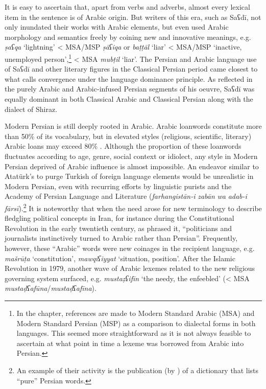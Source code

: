 \documentclass[output=paper]{langsci/langscibook}
\begin{document}
It is easy to ascertain that, apart from verbs and adverbs, almost every lexical item in the sentence is of Arabic origin. But writers of this era, such as Saʕdī, not only inundated their works with Arabic elements, but even used Arabic morphology and semantics freely by coining new and innovative meanings, e.g. \textit{ṣaʕqa} ‘lightning’ < MSA/MSP \textit{ṣāʕiqa} or \textit{baṭṭāl} ‘liar’ < MSA/MSP ‘inactive, unemployed person’,\footnote{In the chapter, references are made to Modern Standard Arabic (MSA) and Modern Standard Persian (MSP) as a comparison to dialectal forms in both languages. This seemed more straightforward as it is not always feasible to ascertain at what point in time a lexeme was borrowed from Arabic into Persian.} < MSA \textit{mubṭil} ‘liar’. The Persian and Arabic language use of Saʕdī and other literary figures in the Classical Persian period came closest to what \citet{Lucas2015} calls convergence under the language dominance principle. As reflected in the purely Arabic and Arabic-infused Persian segments of his oeuvre, Saʕdī was equally dominant in both Classical Arabic and Classical Persian along with the dialect of Shiraz.

Modern Persian is still deeply rooted in Arabic. Arabic loanwords constitute more than 50\% of its vocabulary, but in elevated styles (religious, scientific, literary) Arabic loans may exceed 80\% \citep{Jeremiás2011}. Although the proportion of these loanwords fluctuates according to age, genre, social context or idiolect, any style in Modern Persian deprived of Arabic influence is almost impossible. An endeavor similar to Atatürk’s to purge Turkish of foreign language elements would be unrealistic in Modern Persian, even with recurring efforts by linguistic purists and the Academy of Persian Language and Literature (\textit{farhangistān-i} \textit{zabān} \textit{wa} \textit{adab-i} \textit{fārsī}).\footnote{An example of their activity is the publication (by \citealt{Rāzī2004}) of a dictionary that lists “pure” Persian words.} It is noteworthy that when the need arose for new terminology to describe fledgling political concepts in Iran, for instance during the Constitutional Revolution in the early twentieth\textsuperscript{} century, as \citet{Elwell-Sutton2000} phrased it, “politicians and journalists instinctively turned to Arabic rather than Persian”. Frequently, however, these “Arabic” words were new coinages in the recipient language, e.g. \textit{mašrūṭa} ‘constitution’, \textit{mawqiʕiyyat} ‘situation, position’. After the Islamic Revolution in 1979, another wave of Arabic lexemes related to the new religious governing system surfaced, e.g. \textit{mustaẓʕifīn} ‘the needy, the enfeebled’ (< MSA \textit{mustaḍʕafūna}\kern 0.5pt/\kern -1pt\textit{mustaḍʕafīna}).
\end{document}
